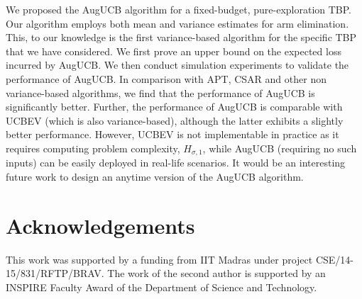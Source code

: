 We proposed the AugUCB algorithm for a fixed-budget, pure-exploration TBP. Our algorithm employs both mean and variance estimates for arm elimination. This, to our knowledge is the first variance-based algorithm for the specific TBP that we have considered. We first prove an upper bound on the expected loss incurred by AugUCB. We then conduct simulation experiments to validate the performance of AugUCB. In comparison with APT, CSAR and other non variance-based algorithms, we find that the performance of AugUCB is significantly better. Further, the performance of AugUCB is comparable with UCBEV (which is also variance-based), although the latter exhibits a slightly better performance.  However, UCBEV is not implementable in practice as it requires computing problem complexity, $H_{\sigma,1}$, while AugUCB (requiring no such inputs) can be easily deployed in real-life scenarios. It would be an interesting future work to design an anytime version of the AugUCB algorithm. 

\section*{Acknowledgements} This work was supported by a funding from IIT Madras under project CSE/14-15/831/RFTP/BRAV. The work of the second author is supported by an INSPIRE Faculty Award of the Department of Science and Technology. 



